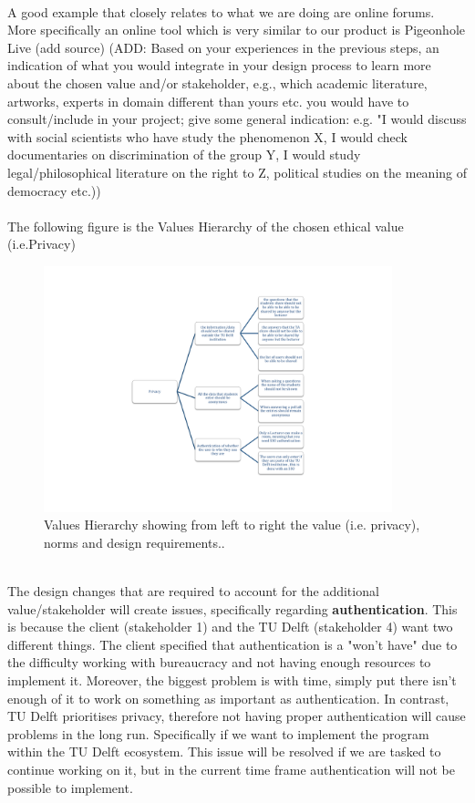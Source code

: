\documentclass{article}
\begin{document}
\\A good example that closely relates to what we are doing are online forums.
More specifically an online tool which is very similar to our product is Pigeonhole Live (add source)  (ADD: Based on your experiences in the previous steps, an indication of what you would integrate in your design process to learn more about the chosen value and/or stakeholder, e.g., which academic literature, artworks, experts in domain different than yours etc. you would have to consult/include in your project; give some general indication: e.g. "I would discuss with social scientists who have study the phenomenon X, I would check documentaries on discrimination of the group Y, I would study legal/philosophical literature on the right to Z, political studies on the meaning of democracy etc.))\\

\\The following figure is the Values Hierarchy of the chosen ethical value (i.e.Privacy) \\

\begin{figure}[h]
    \centering
    \includegraphics[width=0.9\textwidth]{Responsible_CS_tree.pdf}
    \caption{Values Hierarchy showing from left to right the value (i.e. privacy), norms and design requirements..}
    \label{fig:tree}
\end{figure}


\\The design changes that are required to account for the additional value/stakeholder will create issues, specifically regarding \textbf{authentication}.
This is because the client (stakeholder 1) and the TU Delft (stakeholder 4) want two different things.
The client specified that authentication is a "won't have" due to the difficulty working with bureaucracy and not having enough resources to implement it.
Moreover, the biggest problem is with time, simply put there isn't enough of it to work on something as important as authentication.
In contrast, TU Delft prioritises privacy, therefore not having proper authentication will cause problems in the long run.
Specifically if we want to implement the program within the TU Delft ecosystem.
This issue will be resolved if we are tasked to continue working on it, but in the current time frame authentication will not be possible to implement. \\
\end{document}
